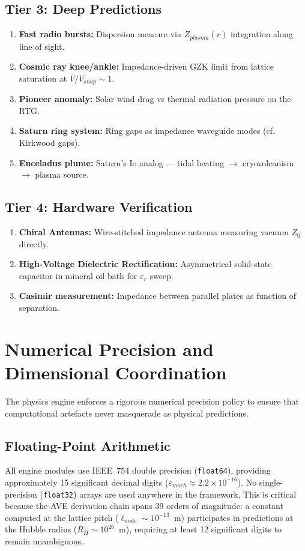 \subsection{Tier 3: Deep Predictions}
\begin{enumerate}
    \item \textbf{Fast radio bursts:} Dispersion measure via
    $Z_{plasma}(r)$ integration along line of sight.
    \item \textbf{Cosmic ray knee/ankle:} Impedance-driven GZK limit
    from lattice saturation at $V/V_{snap} \sim 1$.
    \item \textbf{Pioneer anomaly:} Solar wind drag vs thermal
    radiation pressure on the RTG.
    \item \textbf{Saturn ring system:} Ring gaps as impedance waveguide
    modes (cf. Kirkwood gaps).
    \item \textbf{Enceladus plume:} Saturn's Io analog --- tidal heating
    $\to$ cryovolcanism $\to$ plasma source.
\end{enumerate}

\subsection{Tier 4: Hardware Verification}
\begin{enumerate}
    \item \textbf{Chiral Antennas:} Wire-stitched impedance antenna measuring
    vacuum $Z_0$ directly.
    \item \textbf{High-Voltage Dielectric Rectification:} Asymmetrical solid-state capacitor in mineral oil bath for $\varepsilon_r$ sweep.
    \item \textbf{Casimir measurement:} Impedance between parallel
    plates as function of separation.
\end{enumerate}

\section{Numerical Precision and Dimensional Coordination}
\label{sec:precision_policy}

The physics engine enforces a rigorous numerical precision policy to ensure that computational artefacts never masquerade as physical predictions.

\subsection{Floating-Point Arithmetic}
All engine modules use IEEE~754 double precision (\texttt{float64}), providing approximately 15 significant decimal digits ($\varepsilon_{mach} \approx 2.2 \times 10^{-16}$).  No single-precision (\texttt{float32}) arrays are used anywhere in the framework.  This is critical because the AVE derivation chain spans 39 orders of magnitude: a constant computed at the lattice pitch ($\ell_{node} \sim 10^{-13}$~m) participates in predictions at the Hubble radius ($R_H \sim 10^{26}$~m), requiring at least 12 significant digits to remain unambiguous.

